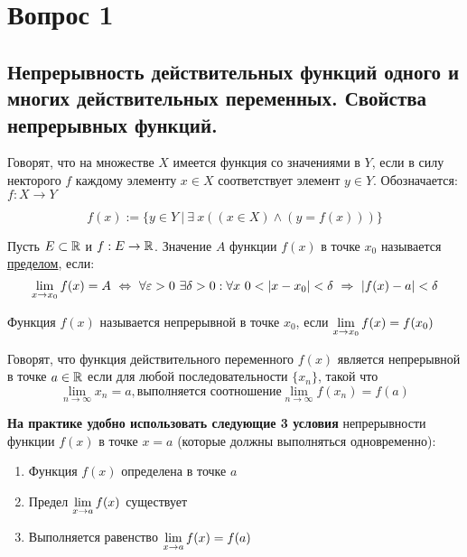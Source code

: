 \section{Вопрос 1}

\subsection{Непрерывность действительных функций одного и многих действительных переменных. Свойства непрерывных функций.}

\begin{defs}
Говорят, что на множестве $X$ имеется функция со значениями в $Y$, если в силу некторого $f$ каждому элементу $x \in X$ соответствует элемент $y \in Y$. Обозначается: $f: X \to Y$

$$f(x) := \{ y \in Y \ | \ \exists \ x ((x\in X) \wedge (y = f(x))) \} $$
\end{defs}


\begin{defs}
	Пусть $E \subset \mathbb{R}$ и $f: E \to \mathbb{R}$. Значение $A$ функции $f(x)$ в точке $x_0$ называется \underline{пределом}, если:
	$$\lim_{x\to x_0} f(x) = A \ \Leftrightarrow \ \forall \varepsilon > 0 \ \exists \delta > 0: \forall x \ 0 < \left| x - x_0\right| < \delta \ \Rightarrow \ \left| f(x) - a\right| < \delta$$
\end{defs}

\begin{defs}
	Функция $f(x)$ называется непрерывной в точке $x_0$, если $\lim\limits_{x \to x_0}f(x) = f(x_0)$
\end{defs}

\begin{defs}
	Говорят, что функция действительного переменного $f(x)$ является непрерывной в точке $a \in \mathbb{R}$ если для любой последовательности $\{x_n\}$, такой что
	$$\lim_{n \to \infty}x_n = a, \text{выполняется соотношение} \lim_{n \to \infty}f(x_n) = f(a)$$
\end{defs}

\textbf{На практике удобно использовать следующие 3 условия} непрерывности функции $f(x)$ в точке $x = a$ (которые должны выполняться одновременно):
\begin{enumerate}
	\item Функция $f(x)$ определена в точке $a$
	\item Предел $\lim\limits_{x \to a}f(x)$ существует
	\item Выполняется равенство $\lim\limits_{x \to a}f(x)= f(a)$
\end{enumerate}

